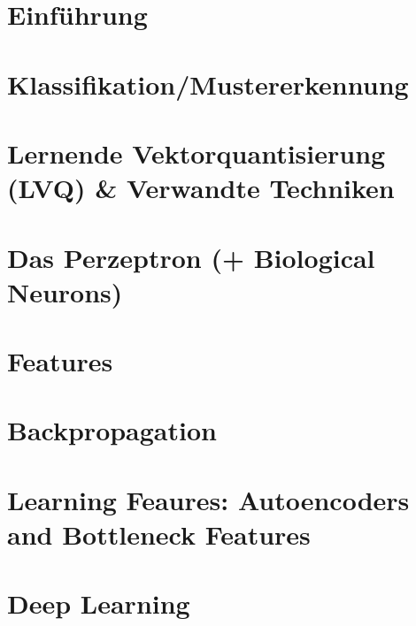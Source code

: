 \documentclass[fleqn,10pt]{SelfArx} %
\begin{document}


\section{Einführung} 





\section{Klassifikation/Mustererkennung}



\section{Lernende Vektorquantisierung (LVQ) \& Verwandte Techniken}


\section{Das Perzeptron (+ Biological Neurons)}
\section{Features}
\section{Backpropagation}
\section{Learning Feaures: Autoencoders and Bottleneck Features}
\section{Deep Learning}
\end{document}
